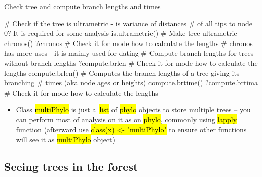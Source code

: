 \documentclass[compress, ucs, xelatex, 11pt, xcolor=svgnames,
  hyperref={
    bookmarks=true,
    unicode=true,
    colorlinks=true,
    pdftitle={Molecular data in R},
    plainpages=false,
    pdfauthor={Vojtech Zeisek},
    pdfsubject={Course about phylogeny and evolution in R},
    pdfcreator={XeLaTeX},
    pdfkeywords={R, evolution, phylogeny, molecular data},
    linkcolor=Tomato,
    anchorcolor=SaddleBrown,
    citecolor=Goldenrod,
    filecolor=DarkMagenta,
    menucolor=Sienna,
    urlcolor=DarkTurquoise,
    pdftex},
  url={hyphens, lowtilde} %
  ]{beamer}
\renewcommand{\texttt}[1]{\hl{\ttfamily #1}}
\begin{document}
\begin{frame}[fragile]{Check tree and compute branch lengths and times}
  \begin{spluscode}
    # Check if the tree is ultrametric - is variance of distances
    # of all tips to node 0? It is required for some analysis
    is.ultrametric()
    # Make tree ultrametric
    chronos()
    ?chronos # Check it for mode how to calculate the lengths
    # chronos has more uses - it is mainly used for dating
    # Compute branch lengths for trees without branch lengths
    ?compute.brlen # Check it for mode how to calculate the lengths
    compute.brlen()
    # Computes the branch lengths of a tree giving its branching
    # times (aka node ages or heights)
    compute.brtime()
    ?compute.brtima # Check it for mode how to calculate the lengths
  \end{spluscode}
  \begin{itemize}
    \item Class \texttt{multiPhylo} is just a~\texttt{list} of \texttt{phylo} objects to store multiple trees -- you can perform most of analysis on it as on \texttt{phylo}, commonly using \texttt{lapply} function (afterward use \texttt{class(x) <- "multiPhylo"} to ensure other functions will see it as \texttt{multiPhylo} object)
  \end{itemize}
\end{frame}

\subsection{Seeing trees in the forest}
\end{document}
